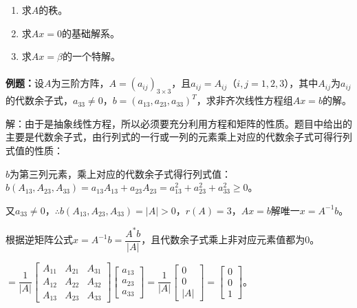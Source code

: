 \begin{enumerate}
    \item 求$A$的秩。
    \item 求$Ax=0$的基础解系。
    \item 求$Ax=\beta$的一个特解。
\end{enumerate}

\paragraph{}

\textbf{例题：}设$A$为三阶方阵，$A=(a_{ij})_{3\times3}$，且$a_{ij}=A_{ij}$（$i,j=1,2,3$），其中$A_{ij}$为$a_{ij}$的代数余子式，$a_{33}\neq0$，$b=(a_{13},a_{23},a_{33})^T$，求非齐次线性方程组$Ax=b$的解。

解：由于是抽象线性方程，所以必须要充分利用方程和矩阵的性质。题目中给出的主要是代数余子式，由行列式的一行或一列的元素乘上对应的代数余子式可得行列式值的性质：

$b$为第三列元素，乘上对应的代数余子式得行列式值：$b(A_{13},A_{23},A_{33})=a_{13}A_{13}+a_{23}A_{23}=a_{13}^2+a_{23}^2+a_{33}^2\geqslant0$。

又$a_{33}\neq0$，$\therefore b(A_{13},A_{23},A_{33})=\vert A\vert>0$，$r(A)=3$，$Ax=b$解唯一$x=A^{-1}b$。

根据逆矩阵公式$x=A^{-1}b=\dfrac{A^*b}{\vert A\vert}$，且代数余子式乘上非对应元素值都为0。

$=\dfrac{1}{\vert A\vert}\left[\begin{array}{ccc}
    A_{11} & A_{21} & A_{31} \\
    A_{12} & A_{22} & A_{32} \\
    A_{13} & A_{23} & A_{33} 
\end{array}\right]\left[\begin{array}{c}
    a_{13} \\
    a_{23} \\
    a_{33}
\end{array}\right]=\dfrac{1}{\vert A\vert}\left[\begin{array}{c}
    0 \\
    0 \\
    \vert A\vert
\end{array}\right]=\left[\begin{array}{c}
    0 \\
    0 \\
    1
\end{array}\right]$。

\paragraph{}

